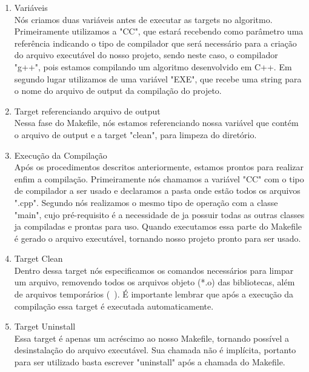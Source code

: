 \documentclass[a4paper]{article}
\begin{document}
\begin{enumerate}
\item{Variáveis}\\
Nós criamos duas variáveis antes de executar as targets no algoritmo. Primeiramente utilizamos a "CC", que estará recebendo como parâmetro uma referência indicando o tipo de compilador que será necessário para a criação do arquivo executável do nosso projeto, sendo neste caso, o compilador "g++", pois estamos compilando um algoritmo desenvolvido em C++. Em segundo lugar utilizamos de uma variável "EXE", que recebe uma string para o nome do arquivo de output da compilação do projeto.

\item{Target referenciando arquivo de output}\\
Nessa fase do Makefile, nós estamos referenciando nossa variável que contém o arquivo de output e a target "clean", para limpeza do diretório.

\item{Execução da Compilação}\\
Após os procedimentos descritos anteriormente, estamos prontos para realizar enfim a compilação. Primeiramente nós chamamos a variável "CC" com o tipo de compilador a ser usado e declaramos a pasta onde estão todos os arquivos ".cpp". Segundo nós realizamos o mesmo tipo de operação com a classe "main", cujo pré-requisito é a necessidade de ja possuir todas as outras classes ja compiladas e prontas para uso. Quando executamos essa parte do Makefile é gerado o arquivo executável, tornando nosso projeto pronto para ser usado.

\item{Target Clean}\\
Dentro dessa target nós especificamos os comandos necessários para limpar um arquivo, removendo todos os arquivos objeto (*.o) das bibliotecas, além de arquivos temporários (~). É importante lembrar que após a execução da compilação essa target é executada automaticamente.

\item{Target Uninstall}\\
Essa target é apenas um acréscimo ao nosso Makefile, tornando possível a desinstalação do arquivo executável. Sua chamada não é implícita, portanto para ser utilizado basta escrever "uninstall" após a chamada do Makefile.

\end{enumerate}

\pagebreak
\end{document}
